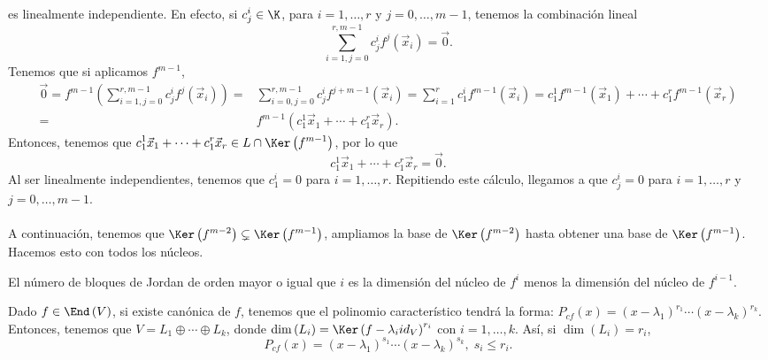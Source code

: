es linealmente independiente. En efecto, si $\displaystyle c^{i}_{j} \in \K $, para $\displaystyle i = 1, \ldots, r $ y $\displaystyle j = 0, \ldots, m -1 $, tenemos la combinación lineal
\[\sum^{r, m -1}_{i = 1, j=0}c^{i}_{j}f^{j}\left(\vec{x}_{i}\right) = \vec{0} .\]
Tenemos que si aplicamos $\displaystyle f^{m -1} $,
\[
\begin{split}
	\vec{0} = f^{m -1}\left(\sum^{r, m -1}_{i = 1, j=0}c^{i}_{j}f^{j}\left(\vec{x}_{i}\right)\right) =& \sum^{r, m -1}_{i = 0, j = 0}c^{i}_{j}f^{j+m -1}\left(\vec{x}_{i}\right)=\sum^{r}_{i = 1}c^{i}_{1}f^{m -1}\left(\vec{x}_{i}\right) = c^{1}_{1}f^{m-1}\left(\vec{x}_{1}\right) + \cdots + c^{r}_{1}f^{m -1}\left(\vec{x}_{r}\right) \\
	= & f^{m -1}\left(c^{1}_{1}\vec{x}_{1}+ \cdots + c^{r}_{1}\vec{x}_{r}\right).
\end{split}
\]
Entonces, tenemos que $\displaystyle c^{1}_{1}\vec{x}_{1}+ \cdots + c^{r}_{1}\vec{x}_{r} \in L \cap \Ker\left(f^{m -1}\right) $, por lo que
\[ c^{1}_{1}\vec{x}_{1}+ \cdots + c^{r}_{1}\vec{x}_{r} = \vec{0} .\]
Al ser linealmente independientes, tenemos que $\displaystyle c^{i}_{1} =0 $ para $\displaystyle i = 1, \ldots, r $. Repitiendo este cálculo, llegamos a que $\displaystyle c^{i}_{j} = 0 $ para $\displaystyle i = 1, \ldots, r $ y $\displaystyle j = 0, \ldots, m -1 $. \\ \\
A continuación, tenemos que $\displaystyle \Ker\left(f^{m -2}\right) \subsetneq \Ker\left(f^{m -1}\right) $, ampliamos la base de $\displaystyle \Ker\left(f^{m -2}\right) $ hasta obtener una base de $\displaystyle \Ker\left(f^{m -1}\right) $. Hacemos esto con todos los núcleos. 
\begin{observation}
\normalfont El número de bloques de Jordan de orden mayor o igual que $\displaystyle i $ es la dimensión del núcleo de $\displaystyle f^{i} $ menos la dimensión del núcleo de $\displaystyle f^{i-1} $.
\end{observation}
Dado $\displaystyle f \in \End\left(V\right) $, si existe canónica de $\displaystyle f $, tenemos que el polinomio característico tendrá la forma: $\displaystyle P_{cf}\left(x\right) = \left(x-\lambda_{1}\right)^{r_{1}} \cdots \left(x - \lambda_{k}\right)^{r_{k}} $. Entonces, tenemos que $\displaystyle V = L_{1} \oplus \cdots \oplus L_{k} $, donde $\displaystyle \dim\left(L_{i}\right) = \Ker\left(f-\lambda_{i}id _{V}\right)^{r_{i}} $ con $\displaystyle i =1, \ldots, k $. Así, si $\displaystyle \dim\left(L_{i}\right) = r_{i}$,
\[P_{cf}\left(x\right) = \left(x - \lambda_{1}\right)^{s_{1}} \cdots \left(x - \lambda_{k}\right)^{s_{k}}, \; s_{i} \leq r_{i} .\]
